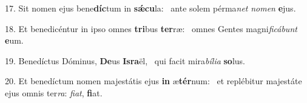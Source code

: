 17. Sit nomen ejus bene\textbf{díc}tum in \textbf{sǽ}\textbf{cu}la: \ast\  ante solem pérma\textit{net} \textit{no}\textit{men} \textbf{e}jus.\

18. Et benedicéntur in ipso omnes \textbf{tri}bus \textbf{ter}ræ: \ast\  omnes Gentes magni\textit{fi}\textit{cá}\textit{bunt} \textbf{e}um.\

19. Benedíctus Dóminus, \textbf{De}us \textbf{Is}\textbf{ra}ël, \ast\  qui facit mira\textit{bí}\textit{li}\textit{a} \textbf{so}lus.\

20. Et benedíctum nomen majestátis ejus \textbf{in} æ\textbf{tér}num: \ast\  et replébitur majestáte ejus omnis ter\textit{ra}: \textit{fi}\textit{at}, \textbf{fi}at.\

